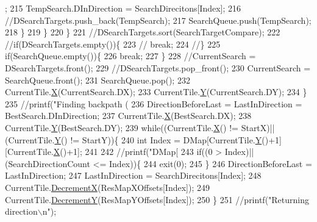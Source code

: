 \begin{DoxyCode}
      ;
215                     TempSearch.DInDirection = SearchDirecitons[Index];
216                     \textcolor{comment}{//DSearchTargets.push\_back(TempSearch);}
217                     SearchQueue.push(TempSearch);
218                 \}
219             \}
220         \}
221         \textcolor{comment}{//DSearchTargets.sort(SearchTargetCompare);}
222         \textcolor{comment}{//if(DSearchTargets.empty())\{}
223         \textcolor{comment}{//    break;    }
224         \textcolor{comment}{//\}}
225         \textcolor{keywordflow}{if}(SearchQueue.empty())\{
226             \textcolor{keywordflow}{break};   
227         \}
228         \textcolor{comment}{//CurrentSearch = DSearchTargets.front();}
229         \textcolor{comment}{//DSearchTargets.pop\_front();}
230         CurrentSearch = SearchQueue.front();
231         SearchQueue.pop();
232         CurrentTile.\hyperlink{classCPosition_a9a6b94d3b91df1492d166d9964c865fc}{X}(CurrentSearch.DX);
233         CurrentTile.\hyperlink{classCPosition_a1aa8a30e2f08dda1f797736ba8c13a87}{Y}(CurrentSearch.DY);
234     \}
235     \textcolor{comment}{//printf("Finding backpath (%
236     DirectionBeforeLast = LastInDirection = BestSearch.DInDirection;
237     CurrentTile.\hyperlink{classCPosition_a9a6b94d3b91df1492d166d9964c865fc}{X}(BestSearch.DX);
238     CurrentTile.\hyperlink{classCPosition_a1aa8a30e2f08dda1f797736ba8c13a87}{Y}(BestSearch.DY);
239     \textcolor{keywordflow}{while}((CurrentTile.\hyperlink{classCPosition_a9a6b94d3b91df1492d166d9964c865fc}{X}() != StartX)||(CurrentTile.\hyperlink{classCPosition_a1aa8a30e2f08dda1f797736ba8c13a87}{Y}() != StartY))\{
240         \textcolor{keywordtype}{int} Index = DMap[CurrentTile.\hyperlink{classCPosition_a1aa8a30e2f08dda1f797736ba8c13a87}{Y}()+1][CurrentTile.\hyperlink{classCPosition_a9a6b94d3b91df1492d166d9964c865fc}{X}()+1];
241         
242         \textcolor{comment}{//printf("DMap[%
243         \textcolor{keywordflow}{if}((0 > Index)||(SearchDirectionCount <= Index))\{
244             exit(0);   
245         \}
246         DirectionBeforeLast = LastInDirection;
247         LastInDirection = SearchDirecitons[Index];
248         CurrentTile.\hyperlink{classCPosition_a64f0d8ef8ca26c8b66b0997b3b132416}{DecrementX}(ResMapXOffsets[Index]);
249         CurrentTile.\hyperlink{classCPosition_a51ee44d9e0457d6277567fd8a66fdec7}{DecrementY}(ResMapYOffsets[Index]);
250     \}
251     \textcolor{comment}{//printf("Returning direction\(\backslash\)n");}
}}
\end{DoxyCode}
